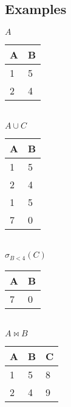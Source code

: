 \documentclass[12pt, a4paper]{article}
\begin{document}
		\subsection{Examples}
			\begin{minipage}[t]{0.32\textwidth}
				\begin{center}
				$A$\\
				\begin{tabular}{|l|l|}
				\hline
				A & B \\ \hline
				1 & 5 \\ \hline
				2 & 4 \\ \hline
				\end{tabular}\\[4mm]
				$A\cup C$\\
				\begin{tabular}{|l|l|}
				\hline
				A & B \\ \hline
				1 & 5 \\ \hline
				2 & 4 \\ \hline
				1 & 5 \\ \hline
				7 & 0 \\ \hline
				\end{tabular}\\[4mm]
				$\sigma_{B<4}(C)$\\
				\begin{tabular}{|l|l|}
				\hline
				A & B \\ \hline
				7 & 0 \\ \hline
				\end{tabular}\\[4mm]
				$A\bowtie B$\\
				\begin{tabular}{|l|l|l|}
				\hline
				 A & B & C \\ \hline
				 1 & 5 & 8 \\ \hline
				 2 & 4 & 9 \\ \hline
				\end{tabular}
				
				\end{center}
			\end{minipage}
\end{document}
